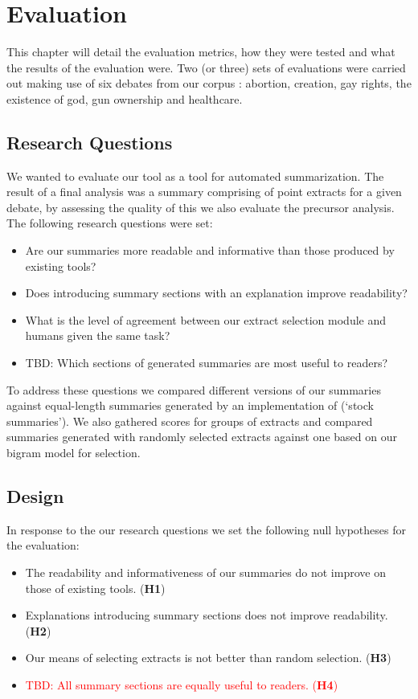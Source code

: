 \chapter{Evaluation\label{chap:evaluation}}
  This chapter will detail the evaluation metrics, how they were tested and what the results of the evaluation were. Two (or three) sets of evaluations were carried out making use of six debates from our corpus \cite{walker2012corpus}: abortion, creation, gay rights, the existence of god, gun ownership and healthcare.

  \section{Research Questions}
    We wanted to evaluate our tool as a tool for automated summarization. The result of a final analysis was a summary comprising of point extracts for a given debate, by assessing the quality of this we also evaluate the precursor analysis. The following research questions were set:

    \begin{itemize}
      \item{Are our summaries more readable and informative than those produced by existing tools?}
      \item{Does introducing summary sections with an explanation improve readability?}
      \item{What is the level of agreement between our extract selection module and humans given the same task?}
      \item{TBD: Which sections of generated summaries are most useful to readers?}
    \end{itemize}

    To address these questions we compared different versions of our summaries against equal-length summaries generated by an implementation of \cite{nenkova2006compositional} (`stock summaries'). We also gathered scores for groups of extracts and compared summaries generated with randomly selected extracts against one based on our bigram model for selection.

  \section{Design}
    In response to the our research questions we set the following null hypotheses for the evaluation:

    \begin{itemize}
      \item{The readability and informativeness of our summaries do not improve on those of existing tools. (\textbf{H1})}
      \item{Explanations introducing summary sections does not improve readability. (\textbf{H2})}
      \item{Our means of selecting extracts is not better than random selection. (\textbf{H3})}
      \item{\textcolor{red}{TBD: All summary sections are equally useful to readers. (\textbf{H4})}}
    \end{itemize}

